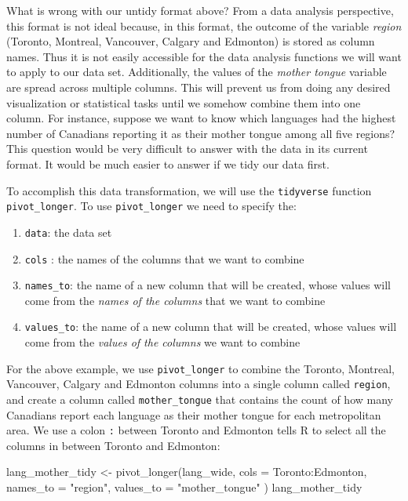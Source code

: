 \documentclass[
]{krantz}
\makeatletter
\newenvironment{Shaded}{\begin{snugshade}}{\end{snugshade}}
\newcommand{\AttributeTok}[1]{\textcolor[rgb]{0.61,0.61,0.61}{#1}}
\newcommand{\FunctionTok}[1]{\textcolor[rgb]{0,0,0}{#1}}
\newcommand{\NormalTok}[1]{#1}
\newcommand{\OtherTok}[1]{\textcolor[rgb]{0.37,0.37,0.37}{#1}}
\newcommand{\SpecialCharTok}[1]{\textcolor[rgb]{0,0,0}{#1}}
\newcommand{\StringTok}[1]{\textcolor[rgb]{0.5,0.5,0.5}{#1}}
\newenvironment{kframe}{%
\medskip{}
\setlength{\fboxsep}{.8em}
 \def\at@end@of@kframe{}%
 \ifinner\ifhmode%
  \def\at@end@of@kframe{\end{minipage}}%
  \begin{minipage}{\columnwidth}%
 \fi\fi%
 \def\FrameCommand##1{\hskip\@totalleftmargin \hskip-\fboxsep
 \colorbox{shadecolor}{##1}\hskip-\fboxsep
     \hskip-\linewidth \hskip-\@totalleftmargin \hskip\columnwidth}%
 \MakeFramed {\advance\hsize-\width
   \@totalleftmargin\z@ \linewidth\hsize
   \@setminipage}}%
 {\par\unskip\endMakeFramed%
 \at@end@of@kframe}
\renewenvironment{Shaded}{\begin{kframe}}{\end{kframe}}
\makeatother
\begin{document}
What is wrong with our untidy format above? From a data analysis perspective, this format is not ideal because, in this format, the outcome of the variable \emph{region} (Toronto, Montreal, Vancouver, Calgary and Edmonton) is stored as column names. Thus it is not easily accessible for the data analysis functions we will want to apply to our data set. Additionally, the values of the \emph{mother tongue} variable are spread across multiple columns. This will prevent us from doing any desired visualization or statistical tasks until we somehow combine them into one column. For instance, suppose we want to know which languages had the highest number of Canadians reporting it as their mother tongue among all five regions? This question would be very difficult to answer with the data in its current format. It would be much easier to answer if we tidy our data first.

To accomplish this data transformation, we will use the \texttt{tidyverse} function \texttt{pivot\_longer}. To use \texttt{pivot\_longer} we need to specify the:

\begin{enumerate}
\def\labelenumi{\arabic{enumi}.}
\item
  \texttt{data}: the data set
\item
  \texttt{cols} : the names of the columns that we want to combine
\item
  \texttt{names\_to}: the name of a new column that will be created, whose values will come from the \emph{names of the columns} that we want to combine
\item
  \texttt{values\_to}: the name of a new column that will be created, whose values will come from the \emph{values of the columns} we want to combine
\end{enumerate}

For the above example, we use \texttt{pivot\_longer} to combine the Toronto, Montreal, Vancouver, Calgary and Edmonton columns into a single column called \texttt{region}, and create a column called \texttt{mother\_tongue} that contains the count of how many Canadians report each language as their mother tongue for each metropolitan area. We use a colon \texttt{:} between Toronto and Edmonton tells R to select all the columns in between Toronto and Edmonton:

\begin{Shaded}
\begin{Highlighting}[]
\NormalTok{lang\_mother\_tidy }\OtherTok{\textless{}{-}} \FunctionTok{pivot\_longer}\NormalTok{(lang\_wide,}
  \AttributeTok{cols =}\NormalTok{ Toronto}\SpecialCharTok{:}\NormalTok{Edmonton,}
  \AttributeTok{names\_to =} \StringTok{"region"}\NormalTok{,}
  \AttributeTok{values\_to =} \StringTok{"mother\_tongue"}
\NormalTok{)}
\NormalTok{lang\_mother\_tidy}
\end{Highlighting}
\end{Shaded}
\end{document}

